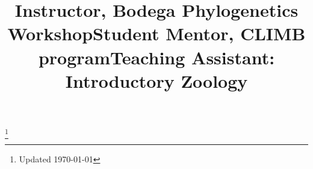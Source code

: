 \documentclass[margin]{res}
\begin{document}
\begin{resume}
\title{Instructor, Bodega Phylogenetics Workshop}
\begin{position}
  \vspace{-.5cm}
\end{position}


\title{Student Mentor, CLIMB program}
\begin{position}
  \vspace{-.5cm}
\end{position}

\title{Teaching Assistant: Introductory Zoology}
\begin{position}
  \vspace{-.5cm}
\end{position}





\end{resume}
\let\thefootnote\relax\footnote{Updated \today}
\end{document}
